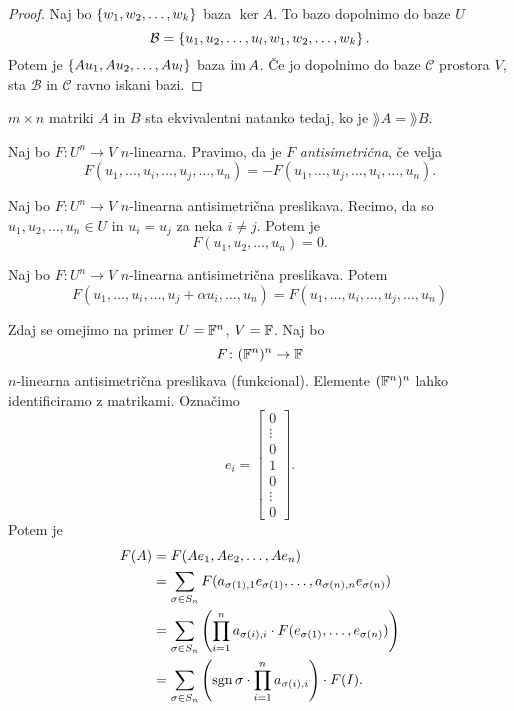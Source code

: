 \documentclass[12pt, a4paper]{article}
\begin{document}
\begin{proof}
Naj bo $\left\{w_1,w_2,\dots,w_k\right\}$ baza $\ker A$. To bazo dopolnimo do baze $U$
\[
\mathcal{B}=\left\{u_1,u_2,\dots,u_l,w_1,w_2,\dots,w_k\right\}.
\]
Potem je $\left\{Au_1,Au_2,\dots,Au_l\right\}$ baza $\operatorname{im} A$. Če jo dopolnimo do baze $\mathcal{C}$ prostora $V$, sta $\mathcal{B}$ in $\mathcal{C}$ ravno iskani bazi.
\end{proof}

\begin{izrek}
$m\times n$ matriki $A$ in $B$ sta ekvivalentni natanko tedaj, ko je $\rang A=\rang B$.
\end{izrek}


%
%
%
%

\begin{definicija}
Naj bo $F\colon U^n\to V$ $n$-linearna. Pravimo, da je $F$ \emph{antisimetrična}, če velja
\[
F(u_1,\dots,u_i,\dots,u_j,\dots,u_n)=-F(u_1,\dots,u_j,\dots,u_i,\dots,u_n).
\]
\end{definicija}

\begin{trditev}
Naj bo $F\colon U^n\to V$ $n$-linearna antisimetrična preslikava. Recimo, da so $u_1,u_2,\dots,u_n\in U$ in $u_i=u_j$ za neka $i\ne j$. Potem je
\[
F(u_1,u_2,\dots,u_n)=0.
\]
\end{trditev}

\obvs

\begin{trditev}
Naj bo $F\colon U^n\to V$ $n$-linearna antisimetrična preslikava. Potem
\[
F(u_1,\dots,u_i,\dots,u_j+\alpha u_i,\dots,u_n)=F(u_1,\dots,u_i,\dots,u_j,\dots,u_n)
\]
\end{trditev}

\obvs

Zdaj se omejimo na primer $U=\mathbb{F}^n$, $V=\mathbb{F}$. Naj bo
\[
F\colon (\mathbb{F}^n)^n\to\mathbb{F}
\]
$n$-linearna antisimetrična preslikava (funkcional). Elemente $(\mathbb{F}^n)^n$ lahko identificiramo z matrikami. Označimo
\[
e_i=\begin{bmatrix}
0      \\ 
\vdots \\ 
0      \\ 
1      \\ 
0      \\ 
\vdots \\ 
0
\end{bmatrix}.
\]
Potem je
\begin{align*}
F(A)&=F(Ae_1,Ae_2,\dots,Ae_n)
\\
&=\sum_{\sigma\in S_n} F(a_{\sigma(1),1}e_{\sigma(1)},\dots,a_{\sigma(n),n}e_{\sigma(n)})
\\
&=\sum_{\sigma\in S_n} \left(\prod_{i=1}^n a_{\sigma(i),i}\cdot F(e_{\sigma(1)},\dots,e_{\sigma(n)})\right)
\\
&=\sum_{\sigma\in S_n} \left(\operatorname{sgn}\sigma\cdot\prod_{i=1}^n a_{\sigma(i),i}\right)\cdot F(I).
\end{align*}
\end{document}
